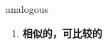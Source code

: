 
\begin{frame}
{\huge analogous}
\begin{center}
\begin{enumerate}\Large
  \item \textbf{相似的，可比较的}
\end{enumerate}
\end{center}
\end{frame}
